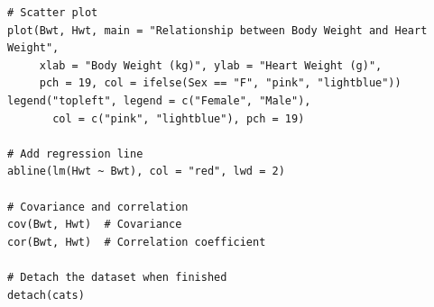 \documentclass[a4paper,12pt]{article}
\begin{document}
\begin{lstlisting}[caption={Complete R code for statistical analysis}, label={lst:complete_code}]
# Scatter plot
plot(Bwt, Hwt, main = "Relationship between Body Weight and Heart Weight",
     xlab = "Body Weight (kg)", ylab = "Heart Weight (g)",
     pch = 19, col = ifelse(Sex == "F", "pink", "lightblue"))
legend("topleft", legend = c("Female", "Male"),
       col = c("pink", "lightblue"), pch = 19)

# Add regression line
abline(lm(Hwt ~ Bwt), col = "red", lwd = 2)

# Covariance and correlation
cov(Bwt, Hwt)  # Covariance
cor(Bwt, Hwt)  # Correlation coefficient

# Detach the dataset when finished
detach(cats)
\end{lstlisting}
\end{document}
